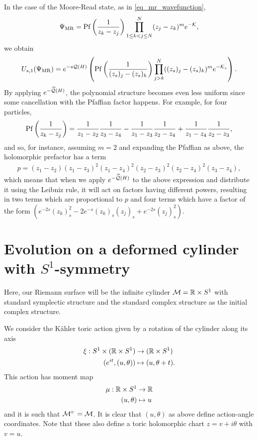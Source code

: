 \documentclass[notas.tex]{subfiles}
\begin{document}
In the case of the Moore-Read state, as in \eqref{eq_mr_wavefunction}, 
\begin{align}
	\Psi_{\text{MR}} =  \operatorname{Pf}\left ( \frac{1}{z_k - z_j} \right ) \prod_{1 \leq k < j \leq N}^N(z_j - z_k)^m e^{-\mathcal{K}},
\end{align}
we obtain
\begin{align} \label{mr_evolved}
	U_{s,1}(\Psi_{\text{MR}}) = e^{-s\mathcal{Q}(H)} \left ( \operatorname{Pf}\left ( \frac{1}{(z_{s})_j - (z_{s})_k} \right ) \prod_{j > k}^N((z_{s})_j - (z_{s})_k)^m e^{-\mathcal{K}_s}\right ).
\end{align}
By applying $e^{- \widehat {\mathcal{Q}}(H)}$, the polynomial structure becomes even less uniform since some cancellation with the Pfaffian factor happens. For example, for four particles,
\begin{align*}
	\operatorname{Pf}\left ( \frac{1}{z_k - z_j} \right )  = \frac{1}{z_1 - z_2}\frac{1}{z_3 - z_4} - \frac{1}{z_1 - z_3}\frac{1}{z_2 - z_4} + \frac{1}{z_1 - z_4} \frac{1}{z_2 - z_3},
\end{align*}
and so, for instance, assuming $m=2$ and expanding the Pfaffian as above, the holomorphic prefactor has a term
\begin{align} \label{eq_pfaffian_structure_change}
	p = (z_1 - z_2)(z_1 - z_3)^2(z_1 - z_4)^2(z_2 - z_3)^2(z_2 - z_4)^2(z_3 - z_4),
\end{align}
which means that when we apply $e^{- \widehat {\mathcal{Q}}(H)}$ to the above expression and distribute it using the Leibniz rule, it will act on factors having different powers, resulting in two terms which are proportional to $p$ and four terms which have a factor of the form $\left ( e^{-2s} (z_k)_{s}^2 - 2 e^{-s} (z_k)_{s}(z_j)_{s} + e^{-2s} (z_j)_{s}^2\right )$. 

\section{Evolution on a deformed cylinder with $S^1$-symmetry} \label{sec_cyl}
Here, our Riemann surface will be the infinite cylinder $\mathcal{M} = \mathbb{R} \times S^1$ with standard symplectic structure and the standard complex structure as the initial complex structure.

We consider the Kähler toric action given by a rotation of the cylinder along its axis
\begin{align*}
	\xi: S^1 \times (\mathbb{R} \times S^1) &\to (\mathbb{R} \times S^1) \\
	(e^{it}, (u,\theta)) &\mapsto (u, \theta + t).
\end{align*}
This action has moment map
\begin{align*}
	\mu: \mathbb{R} \times S^1 &\to \mathbb{R} \\
	(u, \theta) &\mapsto u
\end{align*}
and it is such that $\mfld^\circ = \mfld$. It is clear that $(u, \theta)$ as above define action-angle coordinates. Note that these also define a toric holomorphic chart $z = v + i\theta$ with $v = u$.
\end{document}
